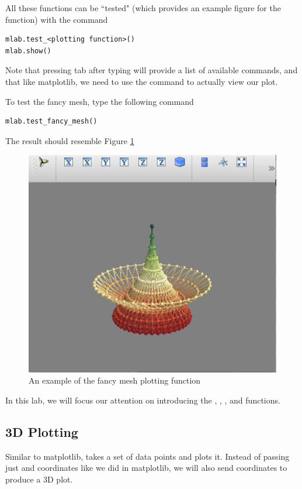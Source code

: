 All these functions can be ``tested" (which provides an example figure for the function) with the command
\begin{lstlisting}
mlab.test_<plotting function>()
mlab.show()
\end{lstlisting}
Note that pressing tab after typing  will provide a 
list of available commands, and that like matplotlib, we need to use the  command to actually view our plot. 

To test the fancy mesh, type the following command
\begin{lstlisting}
mlab.test_fancy_mesh()
\end{lstlisting}

The result should resemble Figure \ref{mayavi:fancymesh}

\begin{figure} 
\includegraphics[width=\textwidth]{fancymesh.pdf}
\caption{An example of the fancy mesh plotting function} 
\label{mayavi:fancymesh}
\end{figure}


In this lab, we will focus our attention on introducing the , , 
, and  functions. 


\subsection*{3D Plotting} Similar to matplotlib,  takes a set
of data points and plots it. Instead of passing just  and 
coordinates like we did in matplotlib, we will also send 
coordinates to produce a 3D plot. 

